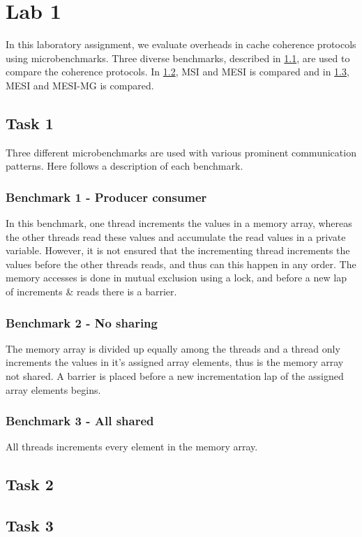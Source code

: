 \section{Lab 1}
\label{sec:lab1}
In this laboratory assignment, we evaluate overheads in cache coherence protocols using microbenchmarks. Three diverse benchmarks, described in \ref{sec:lab11}, are used to compare the coherence protocols. In \ref{sec:lab12}, MSI and MESI is compared and in \ref{sec:lab13}, MESI and MESI-MG is compared.


\subsection{Task 1}
\label{sec:lab11}
Three different microbenchmarks are used with various prominent communication patterns. Here follows a description of each benchmark.
\subsubsection*{Benchmark 1 - Producer consumer}
In this benchmark, one thread increments the values in a memory array, whereas the other threads read these values and accumulate the read values in a private variable. However, it is not ensured that the incrementing thread increments the values before the other threads reads, and thus can this happen in any order. The memory accesses is done in mutual exclusion using a lock, and before a new lap of increments \& reads there is a barrier.

\subsubsection*{Benchmark 2 - No sharing}
The memory array is divided up equally among the threads and a thread only increments the values in it's assigned array elements, thus is the memory array not shared. A barrier is placed before a new incrementation lap of the assigned array elements begins. 

\subsubsection*{Benchmark 3 - All shared}
All threads increments every element in the memory array.

\subsection{Task 2}
\label{sec:lab12}



\subsection{Task 3}
\label{sec:lab13}
